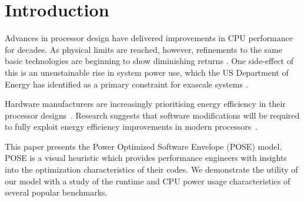 \section{Introduction}
Advances in processor design have delivered improvements in CPU performance for decades. As physical limits are reached, however, refinements to the same basic technologies are beginning to show diminishing returns \cite{esmaeilzadeh:2011aa}. One side-effect of this is an unsustainable rise in system power use, which the US Department of Energy has identified as a primary constraint for exascale systems \cite{shalf:2011aa}.

Hardware manufacturers are increasingly prioritising energy efficiency in their processor designs~\cite{kurd:2014aa}. 
Research suggests that software modifications will be required to fully exploit energy efficiency improvements in modern processors~\cite{shao:2013aa}. 

This paper presents the Power Optimized Software Envelope (POSE) model.
POSE is a visual heuristic which provides performance engineers with insights into the optimization characteristics of their codes.
We demonstrate the utility of our model with a study of the runtime and CPU power usage characteristics of several popular benchmarks.

